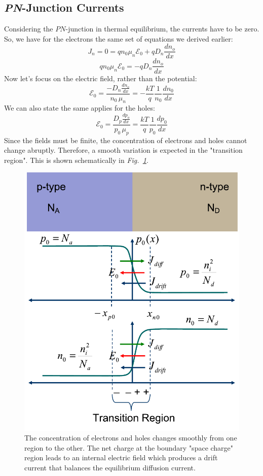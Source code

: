 \subsection{\emph{PN}-Junction Currents}
Considering the $PN$-junction in thermal equilibrium,  the currents have to be zero.  So, we have for the electrons the same set of equations we derived earlier:
    \begin{equation} 
        J_n = 0 = q{n_0}{\mu _n}{\mathcal{E}_0} + q{D_n}\frac{dn_o}{dx}
    \end{equation}
    \begin{equation} 
        q{n_0}{\mu _n}{\mathcal{E}_0} =  - q{D_n}\frac{dn_o}{dx}
    \end{equation}
Now let's focus on the electric field, rather than the potential:
    \begin{equation} 
        \mathcal{E}_0 = \frac{-D_n\frac{dn_o}{dx}} {n_0\,\mu_n} = -\frac{kT}{q}\frac{1}{n_0}\frac{dn_0}{dx} 
    \end{equation}
We can also state the same applies for the holes:
    \begin{equation} 
        \mathcal{E}_0 = \frac{D_p\frac{dp_o}{dx}} {p_0\,\mu_p} = \frac{kT}{q}\frac{1}{p_0}\frac{dp_0}{dx} 
    \end{equation}
Since the fields must be finite, the concentration of electrons and holes cannot change abruptly. Therefore, a smooth variation is expected in the "transition region".  This is shown schematically in \emph{Fig.~\ref{fig:slide11}}.
\begin{figure}[H]
\centering
\includegraphics[width=.65\columnwidth]{slide11}
\caption{The concentration of electrons and holes changes smoothly from one region to the other.  The net charge at the boundary "space charge" region leads to an internal electric field which produces a drift current that balances the equilibrium diffusion current.}
\label{fig:slide11}
\end{figure}
\newpage
